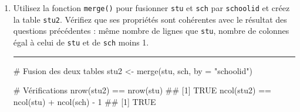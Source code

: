 \documentclass[12pt,twosided, notitlepage]{book}
\newenvironment{Shaded}{}{}
\newcommand{\KeywordTok}[1]{\textcolor[rgb]{0.00,0.00,1.00}{#1}}
\newcommand{\DataTypeTok}[1]{#1}
\newcommand{\DecValTok}[1]{#1}
\newcommand{\StringTok}[1]{\textcolor[rgb]{0.00,0.50,0.50}{#1}}
\newcommand{\CommentTok}[1]{\textcolor[rgb]{0.00,0.50,0.00}{#1}}
\newcommand{\OperatorTok}[1]{#1}
\newcommand{\NormalTok}[1]{#1}
\newif \ifsol
\renewenvironment{Shaded}{\begin{snugshade}}{\end{snugshade}}
\begin{document}
\begin{enumerate}
\begin{enumerate}
    \ifsol 

    \begin{center} \rule{0.5\linewidth}{\linethickness}\end{center}

\begin{Shaded}
\begin{Highlighting}[]
\CommentTok{# Pour vérifier que schoolid identifie sch il suffit}
\CommentTok{# de comparer le nombre de valeurs distinctes au}
\CommentTok{# nombre de lignes}
\KeywordTok{length}\NormalTok{(}\KeywordTok{unique}\NormalTok{(sch}\OperatorTok{$}\NormalTok{schoolid))}
\NormalTok{  ## [1] 226}
\KeywordTok{nrow}\NormalTok{(sch)}
\NormalTok{  ## [1] 226}
\CommentTok{# Tout va bien !    }
\end{Highlighting}
\end{Shaded}

    \begin{center} \rule{0.5\linewidth}{\linethickness}\end{center}

    \bigskip  \fi 
  \item
    Utilisez la fonction \texttt{merge()} pour
    fusionner \texttt{stu} et \texttt{sch} par \texttt{schoolid} et
    créez la table \texttt{stu2}. Vérifiez que ses propriétés sont
    cohérentes avec le résultat des questions précédentes : même nombre
    de lignes que \texttt{stu}, nombre de colonnes égal à celui de
    \texttt{stu} et de \texttt{sch} moins 1.

    \ifsol 

    \begin{center} \rule{0.5\linewidth}{\linethickness}\end{center}

\begin{Shaded}
\begin{Highlighting}[]
\CommentTok{# Fusion des deux tables}
\NormalTok{stu2 <-}\StringTok{ }\KeywordTok{merge}\NormalTok{(stu, sch, }\DataTypeTok{by =} \StringTok{"schoolid"}\NormalTok{)}

\CommentTok{# Vérifications }
\KeywordTok{nrow}\NormalTok{(stu2) }\OperatorTok{==}\StringTok{ }\KeywordTok{nrow}\NormalTok{(stu)}
\NormalTok{  ## [1] TRUE}
\KeywordTok{ncol}\NormalTok{(stu2) }\OperatorTok{==}\StringTok{ }\KeywordTok{ncol}\NormalTok{(stu) }\OperatorTok{+}\StringTok{ }\KeywordTok{ncol}\NormalTok{(sch) }\OperatorTok{-}\StringTok{ }\DecValTok{1}
\NormalTok{  ## [1] TRUE}
\end{Highlighting}
\end{Shaded}


\end{enumerate}
\end{enumerate}
\end{document}
